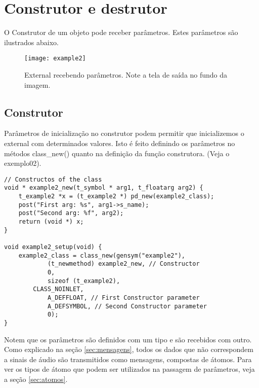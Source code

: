 
\chapter{Construtor e destrutor}

O Construtor de um objeto pode receber parâmetros. Estes parâmetros são
ilustrados abaixo.

\begin{figure}[h!]
	\centering
	\texttt{[image: example2]}
	\caption{External recebendo parâmetros. Note a tela de saída no fundo da imagem.}
\end{figure}

\section{Construtor}

Parâmetros de inicialização no construtor podem permitir que inicializemos o
external com determinados valores. Isto é feito definindo os parâmetros no
métodos class\_new() quanto na definição da função construtora. (Veja o
exemplo02).

\begin{lstlisting}
// Constructos of the class
void * example2_new(t_symbol * arg1, t_floatarg arg2) {
    t_example2 *x = (t_example2 *) pd_new(example2_class);
    post("First arg: %s", arg1->s_name);
    post("Second arg: %f", arg2);
    return (void *) x;
}

void example2_setup(void) {
    example2_class = class_new(gensym("example2"),
            (t_newmethod) example2_new, // Constructor
            0,
            sizeof (t_example2),
	    CLASS_NOINLET,
            A_DEFFLOAT, // First Constructor parameter
            A_DEFSYMBOL, // Second Constructor parameter
            0);
}
\end{lstlisting}


Notem que os parâmetros são definidos com um tipo e são recebidos com outro.
Como explicado na seção \ref{sec:mensagens}, todos os dados que não
correspondem a sinais de áudio são transmitidos como mensagens, compostas de
átomos. Para ver os tipos de átomo que podem ser utilizados na passagem de
parâmetros, veja a seção \ref{sec:atomos}.

